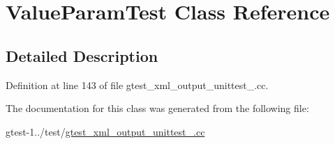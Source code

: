 \hypertarget{classValueParamTest}{\section{\-Value\-Param\-Test \-Class \-Reference}
\label{d3/d55/classValueParamTest}
}


\subsection{\-Detailed \-Description}


\-Definition at line 143 of file gtest\-\_\-xml\-\_\-output\-\_\-unittest\-\_\-.\-cc.



\-The documentation for this class was generated from the following file\-:\begin{DoxyCompactItemize}
\item 
gtest-\/1../test/\hyperlink{gtest__xml__output__unittest___8cc}{gtest\-\_\-xml\-\_\-output\-\_\-unittest\-\_\-.\-cc}\end{DoxyCompactItemize}
